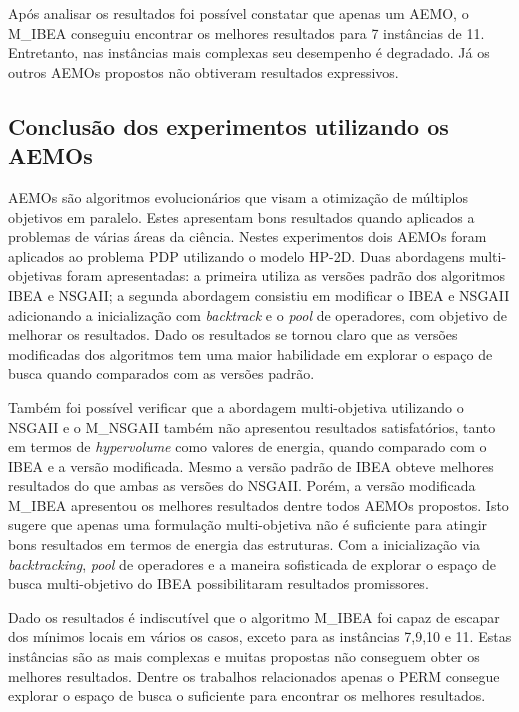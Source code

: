 Após analisar os resultados foi possível constatar que apenas um AEMO, o M\_IBEA conseguiu encontrar os melhores resultados para 7 instâncias de 11. Entretanto, nas instâncias mais complexas seu desempenho é degradado. Já os outros AEMOs propostos não obtiveram resultados expressivos.

\subsection{Conclusão dos experimentos utilizando os AEMOs}

AEMOs são algoritmos evolucionários que visam a otimização de múltiplos objetivos em paralelo. Estes apresentam bons resultados quando aplicados a problemas de várias áreas da ciência.  Nestes experimentos dois AEMOs foram aplicados ao problema PDP utilizando o modelo HP-2D. Duas abordagens multi-objetivas foram apresentadas: a primeira utiliza as versões padrão dos algoritmos IBEA e NSGAII; a segunda abordagem consistiu em modificar o IBEA e NSGAII adicionando a inicialização com \textit{backtrack} e o \textit{pool} de operadores, com objetivo de melhorar os resultados. Dado os resultados se tornou claro que as versões modificadas dos algoritmos tem uma maior habilidade em explorar o espaço de busca quando comparados com as versões padrão.  

Também foi possível verificar que a abordagem multi-objetiva utilizando o NSGAII e o M\_NSGAII também não apresentou resultados satisfatórios, tanto em termos de \textit{hypervolume} como valores de energia,  quando comparado com o IBEA e a versão modificada. Mesmo a versão padrão de IBEA obteve melhores resultados do que ambas as versões do NSGAII. Porém, a versão modificada M\_IBEA apresentou os melhores resultados dentre todos AEMOs propostos. Isto sugere que apenas uma formulação multi-objetiva não é suficiente para atingir bons resultados em termos de energia das estruturas. Com a inicialização via \textit{backtracking}, \textit{pool} de operadores e a maneira sofisticada de explorar o espaço de busca multi-objetivo do IBEA  possibilitaram resultados promissores.

Dado os resultados é indiscutível que o algoritmo M\_IBEA foi capaz de escapar dos mínimos locais em vários os casos, exceto para as instâncias 7,9,10 e 11. Estas instâncias são as mais complexas e muitas propostas não conseguem obter os melhores resultados. Dentre  os trabalhos relacionados apenas o PERM consegue  explorar o espaço de busca o suficiente para encontrar os melhores resultados.

